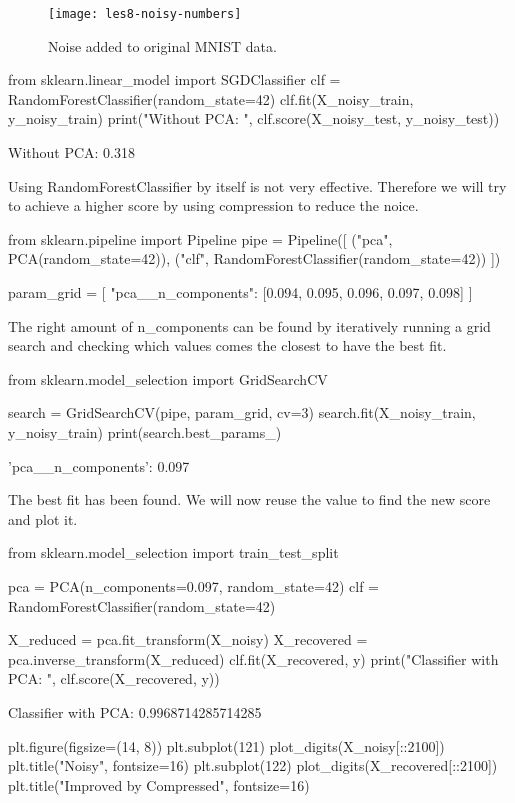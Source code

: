 \documentclass{article}
\begin{document}
\begin{figure}[H]
  \centering
    \texttt{[image: les8-noisy-numbers]}
    \caption{Noise added to original MNIST data.}
    \label{fig:les8-com-c}
\end{figure}

\begin{pyminted}
from sklearn.linear_model import SGDClassifier
clf = RandomForestClassifier(random_state=42)
clf.fit(X_noisy_train, y_noisy_train)
print("Without PCA: ", clf.score(X_noisy_test, y_noisy_test))
\end{pyminted}
\begin{pyconsole}
Without PCA:  0.318
\end{pyconsole}

Using RandomForestClassifier by itself is not very effective. Therefore we will try to achieve a higher score by using compression to reduce the noice.

\begin{pyminted}
from sklearn.pipeline import Pipeline
pipe = Pipeline([
    ("pca", PCA(random_state=42)),
    ("clf", RandomForestClassifier(random_state=42))
])

param_grid = [{
    "pca__n_components": [0.094, 0.095, 0.096, 0.097, 0.098]
}]
\end{pyminted}

The right amount of n\_components can be found by iteratively running a grid search and checking which values comes the closest to have the best fit.

\begin{pyminted}
from sklearn.model_selection import GridSearchCV

search = GridSearchCV(pipe, param_grid, cv=3)
search.fit(X_noisy_train, y_noisy_train)
print(search.best_params_)
\end{pyminted}
\begin{pyconsole}
{'pca__n_components': 0.097}
\end{pyconsole}

The best fit has been found. We will now reuse the value to find the new score and plot it.

\begin{pyminted}
from sklearn.model_selection import train_test_split

pca = PCA(n_components=0.097, random_state=42)
clf = RandomForestClassifier(random_state=42)

X_reduced = pca.fit_transform(X_noisy)
X_recovered = pca.inverse_transform(X_reduced) 
clf.fit(X_recovered, y) %
print("Classifier with PCA: ", clf.score(X_recovered, y)) %
\end{pyminted}
\begin{pyconsole}
Classifier with PCA:  0.9968714285714285
\end{pyconsole}
\begin{pyminted}
plt.figure(figsize=(14, 8))
plt.subplot(121)
plot_digits(X_noisy[::2100])
plt.title("Noisy", fontsize=16)
plt.subplot(122)
plot_digits(X_recovered[::2100])
plt.title("Improved by Compressed", fontsize=16)
\end{pyminted}
\end{document}
